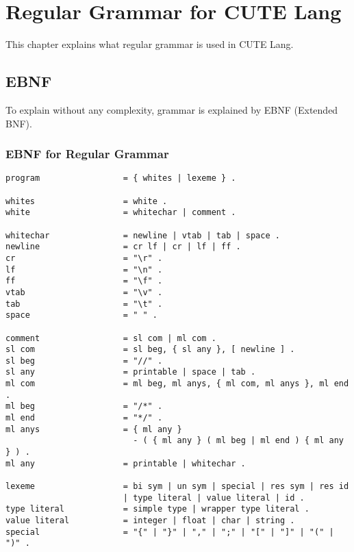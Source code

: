 \documentclass[a4paper, article, oneside, 10pt]{memoir}
\begin{document}
\pagestyle{ruled}
\chapter{Regular Grammar for CUTE Lang}
This chapter explains what regular grammar is used in CUTE Lang.

\section{EBNF}
To explain without any complexity, grammar is explained by EBNF (Extended BNF).

\subsection{EBNF for Regular Grammar}

\begin{verbatim}
program                 = { whites | lexeme } .

whites                  = white .
white                   = whitechar | comment .

whitechar               = newline | vtab | tab | space .
newline                 = cr lf | cr | lf | ff .
cr                      = "\r" .
lf                      = "\n" .
ff                      = "\f" .
vtab                    = "\v" .
tab                     = "\t" .
space                   = " " .

comment                 = sl com | ml com .
sl com                  = sl beg, { sl any }, [ newline ] .
sl beg                  = "//" .
sl any                  = printable | space | tab .
ml com                  = ml beg, ml anys, { ml com, ml anys }, ml end .
ml beg                  = "/*" .
ml end                  = "*/" .
ml anys                 = { ml any }
                          - ( { ml any } ( ml beg | ml end ) { ml any } ) .
ml any                  = printable | whitechar .

lexeme                  = bi sym | un sym | special | res sym | res id
                        | type literal | value literal | id .
type literal            = simple type | wrapper type literal .
value literal           = integer | float | char | string .
special                 = "{" | "}" | "," | ";" | "[" | "]" | "(" | ")" .
\end{verbatim}
\end{document}
